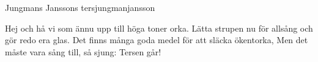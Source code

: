 \begin{song}{Jungmans Janssons ters}{jungmanjansson}
\begin{vers}
Hej och hå vi som ännu upp till höga toner orka.
Lätta strupen nu för allsång och gör redo era glas.
Det finns många goda medel för att släcka ökentorka,
Men det måste vara sång till, så sjung: Tersen går!
\end{vers}
\end{song}

